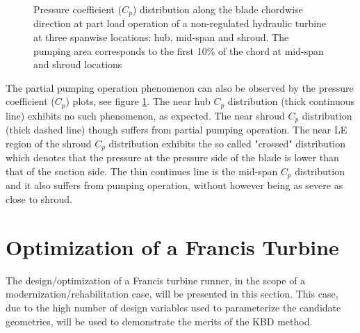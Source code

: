 \begin{figure}[h!]
\begin{minipage}[b]{1\linewidth}
 \centering
\end{minipage}
\caption{Pressure coefficient ($C_p$) distribution along the blade chordwise direction at part load operation of a non-regulated hydraulic turbine at three spanwise locations: hub, mid-span and shroud. The pumping area corresponds to the first 10\% of the chord at mid-span and shroud locations}
\label{design-pumpS2}
\end{figure}

The partial pumping operation phenomenon can also be observed by the pressure coefficient ($C_p$) plots, see figure \ref{design-pumpS2}. The near hub $C_p$ distribution (thick continuous line) exhibits no such phenomenon, as expected.  The near shroud $C_p$ distribution (thick dashed line) though suffers from partial pumping operation. The near LE region of the shroud $C_p$ distribution exhibits the so called "crossed" distribution which denotes that the pressure at the pressure side of the blade is lower than that of the suction side. The thin continues line is the mid-span $C_p$ distribution and it also suffers from pumping operation, without however being as severe as close to shroud.        

\section{Optimization of a Francis Turbine} %
The design/optimization of a Francis turbine runner, in the scope of a modernization/rehabilitation case, will be presented in this section. This case, due to the high number of design variables used to parameterize the candidate geometries, will be used to demonstrate the merits of the KBD method. 
\label{Francis-runner}
